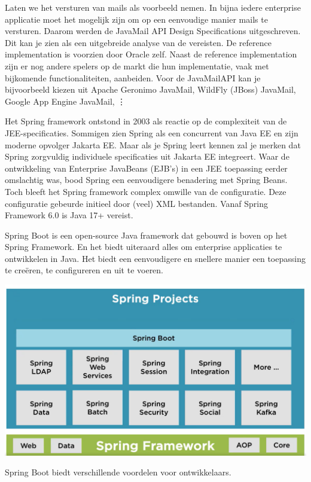 Laten we het versturen van mails als voorbeeld nemen. In bijna iedere enterprise applicatie moet het mogelijk zijn om op een eenvoudige manier mails te versturen.
Daarom werden de JavaMail API Design Specifications uitgeschreven. Dit kan je zien als een uitgebreide analyse van de vereisten.  De reference implementation is voorzien door Oracle zelf. Naast de reference implementation zijn er nog andere spelers op de markt die hun implementatie, vaak met bijkomende functionaliteiten, aanbeiden. Voor de JavaMailAPI kan je bijvoorbeeld kiezen uit Apache Geronimo JavaMail, WildFly (JBoss) JavaMail, Google App Engine JavaMail, \vdots

Het Spring framework ontstond in 2003 als reactie op de complexiteit van de JEE-specificaties.  Sommigen zien Spring als een concurrent van Java EE en zijn moderne opvolger Jakarta EE.  Maar als je Spring leert kennen zal je merken dat Spring zorgvuldig individuele specificaties uit Jakarta EE integreert.  Waar de ontwikkeling van Enterprise JavaBeans (EJB's) in een JEE toepassing eerder omslachtig was,  bood Spring een eenvoudigere benadering met Spring Beans. Toch bleeft het Spring framework complex omwille van de configuratie. Deze configuratie gebeurde initieel door (veel) XML bestanden.  Vanaf Spring Framework 6.0 is Java 17+ vereist.

Spring Boot is een open-source Java framework dat gebouwd is boven op het Spring Framework. 
En het biedt uiteraard alles om enterprise applicaties te ontwikkelen in Java.
Het biedt een eenvoudigere en snellere manier een toepassing te cre\"eren, te configureren en uit te voeren.

\includegraphics[width=\textwidth]{./images/chapter1/spring_framework.png} 
    
Spring Boot  biedt verschillende voordelen voor ontwikkelaars.

